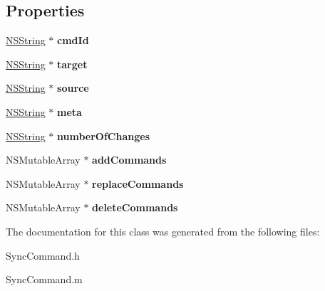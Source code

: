 \subsection*{\-Properties}
\begin{DoxyCompactItemize}
\item 
\hypertarget{interface_sync_command_a92172d916d055119570e950ea06bfe6e}{
\hyperlink{class_n_s_string}{\-N\-S\-String} $\ast$ {\bfseries cmd\-Id}}
\label{interface_sync_command_a92172d916d055119570e950ea06bfe6e}

\item 
\hypertarget{interface_sync_command_af896f9dd1f727b8ac93e8a8b4f144fbf}{
\hyperlink{class_n_s_string}{\-N\-S\-String} $\ast$ {\bfseries target}}
\label{interface_sync_command_af896f9dd1f727b8ac93e8a8b4f144fbf}

\item 
\hypertarget{interface_sync_command_a1b90f5882bfb1b9611f53723fb6d7aab}{
\hyperlink{class_n_s_string}{\-N\-S\-String} $\ast$ {\bfseries source}}
\label{interface_sync_command_a1b90f5882bfb1b9611f53723fb6d7aab}

\item 
\hypertarget{interface_sync_command_a77f1638229f192624ae6acae4b039ce4}{
\hyperlink{class_n_s_string}{\-N\-S\-String} $\ast$ {\bfseries meta}}
\label{interface_sync_command_a77f1638229f192624ae6acae4b039ce4}

\item 
\hypertarget{interface_sync_command_ad4fa3903fa2af3ceee26c315d9a85010}{
\hyperlink{class_n_s_string}{\-N\-S\-String} $\ast$ {\bfseries number\-Of\-Changes}}
\label{interface_sync_command_ad4fa3903fa2af3ceee26c315d9a85010}

\item 
\hypertarget{interface_sync_command_a3cf24be80283a492327b128b98a2d5ad}{
\-N\-S\-Mutable\-Array $\ast$ {\bfseries add\-Commands}}
\label{interface_sync_command_a3cf24be80283a492327b128b98a2d5ad}

\item 
\hypertarget{interface_sync_command_ad40dc9bd9864c9ae84ecf599999146cf}{
\-N\-S\-Mutable\-Array $\ast$ {\bfseries replace\-Commands}}
\label{interface_sync_command_ad40dc9bd9864c9ae84ecf599999146cf}

\item 
\hypertarget{interface_sync_command_adc50e978ddc67658d5f49c8417fcc8ce}{
\-N\-S\-Mutable\-Array $\ast$ {\bfseries delete\-Commands}}
\label{interface_sync_command_adc50e978ddc67658d5f49c8417fcc8ce}

\end{DoxyCompactItemize}


\-The documentation for this class was generated from the following files\-:\begin{DoxyCompactItemize}
\item 
\-Sync\-Command.\-h\item 
\-Sync\-Command.\-m\end{DoxyCompactItemize}
